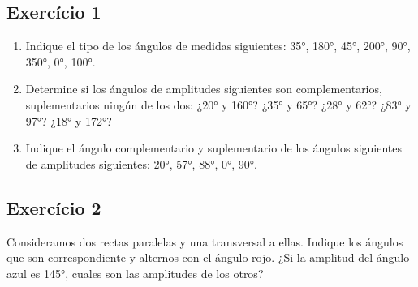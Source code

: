 \begin{center}


\end{center}

\subsection{Exercício 1}

\begin{enumerate}
\item Indique el tipo de los ángulos de medidas siguientes:
  35°, 180°, 45°, 200°, 90°, 350°, 0°, 100°.
\item
  Determine si los ángulos de amplitudes siguientes son complementarios,
suplementarios ningún de los dos:
¿20° y 160°? ¿35° y 65°? ¿28° y 62°? ¿83° y 97°? ¿18° y 172°?
\item Indique el ángulo complementario y suplementario de los ángulos
  siguientes de amplitudes siguientes: 20°, 57°, 88°, 0°, 90°.
\end{enumerate}

\subsection{Exercício 2}

Consideramos dos rectas paralelas y una transversal a ellas.
Indique los ángulos que son correspondiente y alternos con el ángulo rojo.
¿Si la amplitud del ángulo azul es 145°, cuales son las amplitudes de los otros?

\begin{center}


\end{center}

